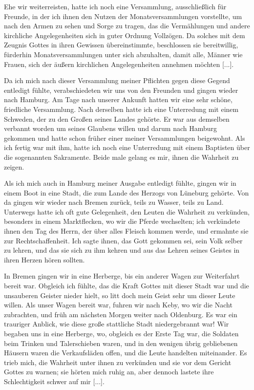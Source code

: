 Ehe wir weiterreisten, hatte ich noch eine Versammlung, ausschließlich 
für Freunde, in der ich ihnen den Nutzen der 
Monatsversammlungen 
vorstellte, um nach den Armen zu sehen und Sorge
zu tragen, das die Vermählungen und andere kirchliche Angelegenheiten 
sich in guter Ordnung Vollzögen. Da solches mit dem
Zeugnis Gottes in ihren Gewissen übereinstimmte, beschlossen sie
bereitwillig, fürderhin Monatsversammlungen unter sich 
abzuhalten, damit alle, Männer wie Frauen, sich der äußern kirchlichen
Angelegenheiten annehmen möchten [...].

Da ich mich nach dieser Versammlung meiner Pflichten gegen
diese Gegend entledigt fühlte, verabschiedeten wir uns von den
Freunden und gingen wieder nach Hamburg.
Am Tage nach unserer Ankunft hatten wir eine sehr schöne,
friedliche Versammlung. Nach derselben hatte ich eine 
Unterredung mit einem Schweden, der zu den Großen seines Landes
gehörte. Er war aus demselben verbannt worden um seines
Glaubens willen und darum nach Hamburg gekommen und hatte
schon früher einer meiner Versammlungen beigewohnt. Als ich
fertig war mit ihm, hatte ich noch eine Unterredung mit einem
Baptisten über die sogenannten Sakramente. 
Beide male gelang es mir, ihnen die Wahrheit zu zeigen.

Als ich mich auch in Hamburg meiner Ausgabe entledigt
fühlte, gingen wir in einem Boot in eine Stadt, die zum Lande
des Herzogs von Lüneburg gehörte. Von da gingen wir wieder
nach Bremen zurück, teils zu Wasser, teils zu Land. Unterwegs
hatte ich oft gute Gelegenheit, den Leuten die Wahrheit zu 
verkünden, besonders in einem Marktflecken, wo wir die Pferde
wechselten; ich verkündete ihnen den Tag des 
Herrn, der über alles 
Fleisch kommen werde, und ermahnte sie zur Rechtschaffenheit.
Ich sagte ihnen, das Gott gekommen sei, sein Volk selber zu
lehren, und das sie sich zu ihm kehren und aus das Lehren seines
Geistes in ihren Herzen hören sollten.

In Bremen gingen wir in eine Herberge, bis ein anderer
Wagen zur Weiterfahrt bereit war. Obgleich ich fühlte, das die
Kraft Gottes mit dieser Stadt war und die unsauberen Geister
nieder hielt, so litt doch mein Geist sehr um dieser Leute willen.
Als unser Wagen bereit war, fuhren wir nach Keby, wo wir die
Nacht zubrachten, und früh am nächsten Morgen weiter nach
Oldenburg. Es war ein trauriger Anblick, wie diese große 
stattliche Stadt niedergebrannt war! Wir begaben uns in eine
Herberge, wo, obgleich es der Erste Tag war, die Soldaten beim
Trinken und Talerschieben waren, und in den wenigen übrig 
gebliebenen Häusern waren die Verkaufsläden offen, und die Leute
handelten miteinander. Es trieb mich, die Wahrheit unter ihnen
zu verkünden und sie vor dem Gericht Gottes zu warnen; sie
hörten mich ruhig an, aber dennoch lastete ihre Schlechtigkeit
schwer auf mir [...].

